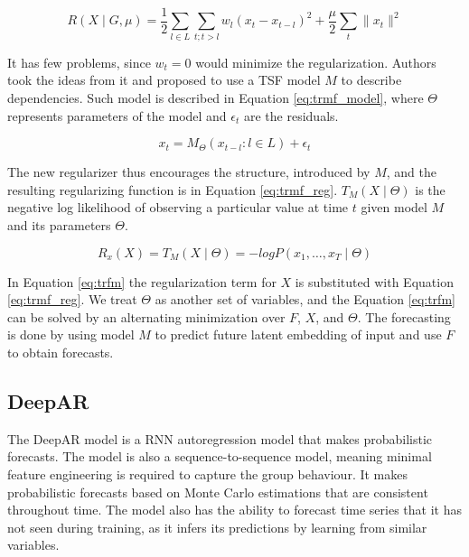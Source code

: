 \documentclass[conference]{IEEEtran}
\begin{document}
\begin{equation}
\label{eq:trmf_graph}
    R(X\mid G, \mu) = \frac{1}{2}\sum_{l\in L}\sum_{t;t>l}w_{l}(x_{t}-x_{t-l})^{2}+\frac{\mu}{2} \sum_{t}\|x_{t}\|^{2}
\end{equation}

It has few problems, since $w_{t} = 0$ would minimize the regularization.
Authors took the ideas from it and proposed to use a TSF model $M$ to describe dependencies.
Such model is described in Equation \ref{eq:trmf_model}, where $\Theta$ represents parameters of the model and $\epsilon_{t}$ are the residuals.

\begin{equation}
\label{eq:trmf_model}
    x_{t} = M_{\Theta}({x_{t-l}:l\in L})+\epsilon_{t}
\end{equation}

The new regularizer thus encourages the structure, introduced by $M$, and the resulting regularizing function is in Equation \ref{eq:trmf_reg}.
$T_{M} (X \mid \Theta)$ is the negative log likelihood of observing a particular value at time $t$ given model $M$ and its parameters $\Theta$.

\begin{equation}
\label{eq:trmf_reg}
    R_{x}(X) = T_{M}(X\mid \Theta) = -log P(x_{1}, \dots, x_{T} \mid \Theta)
\end{equation}

In Equation \ref{eq:trfm} the regularization term for $X$ is substituted with Equation \ref{eq:trmf_reg}.
We treat $\Theta$ as another set of variables, and the Equation \ref{eq:trfm} can be solved by an alternating minimization over $F$, $X$, and $\Theta$.
The forecasting is done by using model $M$ to predict future latent embedding of input and use $F$ to obtain forecasts. 

\subsection{\textbf{DeepAR}}

The DeepAR model is a RNN autoregression model that makes probabilistic forecasts.
The model is also a sequence-to-sequence model, meaning minimal feature engineering is required to capture the group behaviour.
It makes probabilistic forecasts based on Monte Carlo estimations that are consistent throughout time.
The model also has the ability to forecast time series that it has not seen during training, as it infers its predictions by learning from similar variables.
\end{document}
